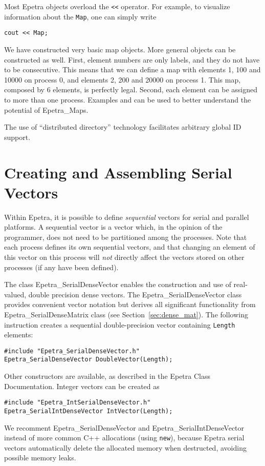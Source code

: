 \begin{remark}
Most Epetra objects overload the \verb!<<! operator. For example, to
visualize information about the \verb!Map!, one can simply write
\begin{verbatim}
cout << Map;
\end{verbatim}
\end{remark}

We have constructed very basic map objects.  More general objects can be
constructed as well. First, element numbers are only labels, and they do
not have to be consecutive.  This means that we can define a map with
elements 1, 100 and 10000 on process 0, and elements 2, 200 and 20000 on
process 1. This map, composed by 6 elements, is perfectly legal. Second,
each element can be assigned to more than one process. 
Examples \newline
{} and \newline {} can be used to
better understand the potential of Epetra\_Maps.

\begin{remark}
  The use of ``distributed directory'' technology facilitates arbitrary
  global ID support.
\end{remark}


\section{Creating and Assembling Serial Vectors}
\label{sec:serial_vec}

Within Epetra, it is possible to define {\em sequential} vectors for
serial and parallel platforms. A sequential vector is a vector which, in
the opinion of the programmer, does not need to be partitioned among the
processes.  Note that each process defines its own sequential vectors,
and that changing an element of this vector on this process will {\em
  not} directly affect the vectors stored on other processes (if any
have been defined).

The class Epetra\_SerialDenseVector enables the construction and use of
real-valued, double precision dense vectors. The
Epetra\_SerialDenseVector class provides convenient vector notation but
derives all significant functionality from Epetra\_SerialDenseMatrix
class (see Section~\ref{sec:dense_mat}). The following instruction
creates a sequential double-precision vector containing {\tt Length}
elements:
\begin{verbatim}
#include "Epetra_SerialDenseVector.h"
Epetra_SerialDenseVector DoubleVector(Length);
\end{verbatim}
Other constructors are available, as described in the Epetra Class
Documentation.
Integer vectors can be created as
\begin{verbatim}
#include "Epetra_IntSerialDenseVector.h"
Epetra_SerialIntDenseVector IntVector(Length);
\end{verbatim}
We recomment Epetra\_SerialDenseVector and Epetra\_SerialIntDenseVector
instead of more common C++ allocations (using \verb!new!), because
Epetra serial vectors automatically delete the allocated memory when
destructed, avoiding possible memory leaks. 

